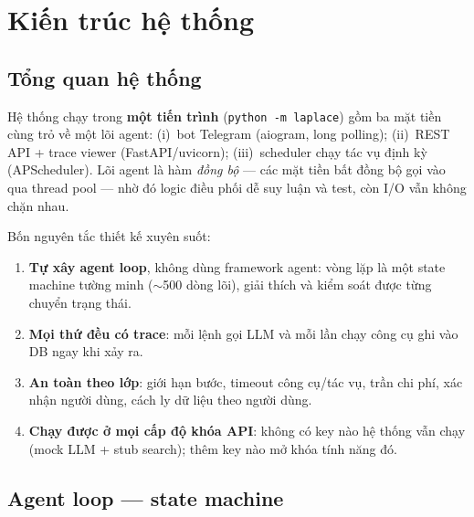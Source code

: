\section{Kiến trúc hệ thống}
\label{sec:kien-truc}

\subsection{Tổng quan hệ thống}

Hệ thống chạy trong \textbf{một tiến trình} (\texttt{python -m laplace}) gồm ba
mặt tiền cùng trỏ về một lõi agent: (i)~bot Telegram (aiogram, long polling);
(ii)~REST API + trace viewer (FastAPI/uvicorn); (iii)~scheduler chạy tác vụ
định kỳ (APScheduler). Lõi agent là hàm \emph{đồng bộ} --- các mặt tiền bất
đồng bộ gọi vào qua thread pool --- nhờ đó logic điều phối dễ suy luận và test,
còn I/O vẫn không chặn nhau.


Bốn nguyên tắc thiết kế xuyên suốt:

\begin{enumerate}
  \item \textbf{Tự xây agent loop}, không dùng framework agent: vòng lặp là một
        state machine tường minh ($\sim$500 dòng lõi), giải thích và kiểm soát
        được từng chuyển trạng thái.
  \item \textbf{Mọi thứ đều có trace}: mỗi lệnh gọi LLM và mỗi lần chạy công cụ
        ghi vào DB ngay khi xảy ra.
  \item \textbf{An toàn theo lớp}: giới hạn bước, timeout công cụ/tác vụ, trần
        chi phí, xác nhận người dùng, cách ly dữ liệu theo người dùng.
  \item \textbf{Chạy được ở mọi cấp độ khóa API}: không có key nào hệ thống vẫn
        chạy (mock LLM + stub search); thêm key nào mở khóa tính năng đó.
\end{enumerate}

\subsection{Agent loop --- state machine}
\label{sec:agent-loop}

